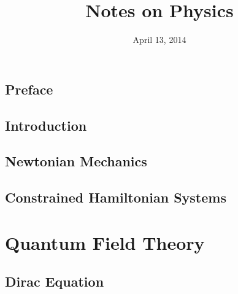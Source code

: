 \documentclass[oneside]{book}
\title{Notes on Physics}
\date{April 13, 2014}
\begin{document}
\frontmatter
\hypersetup{pageanchor=false}
\maketitle
\nocite{*}
\chapter{Preface}
\hypersetup{pageanchor=true}


\tableofcontents

\mainmatter
\chapter{Introduction}


\chapter{Newtonian Mechanics}


\chapter{Constrained Hamiltonian Systems}


\part{Quantum Field Theory}
\chapter{Dirac Equation}


\backmatter
\appendix
\printbibliography[heading=bibintoc]
\end{document}
